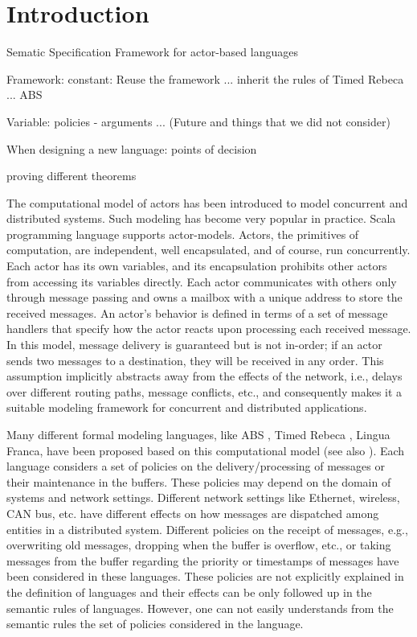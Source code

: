 \section{Introduction}

Sematic Specification Framework for actor-based languages

Framework:
constant: Reuse the framework ...
inherit the rules of Timed Rebeca ... ABS 

Variable: policies - arguments ...
(Future and things that we did not consider)

When designing a new language: points of decision 

proving different theorems

The computational model of actors \cite{Hewitt77,Agha90} has been introduced to model concurrent and distributed systems. Such modeling has become very popular in practice. Scala programming language supports actor-models. Actors, the primitives of computation, are independent, well encapsulated, and of course, run concurrently. Each actor has its own variables, and its encapsulation prohibits other actors from accessing its variables directly. Each actor communicates with others only through message passing and owns a mailbox with a unique address to store the received messages. An actor's behavior is defined in terms of a set of message handlers that specify how the actor reacts upon processing each received message. In this model, message delivery is guaranteed but is not in-order; if an actor sends two messages to a destination, they will be received in any order. This assumption implicitly abstracts away from the effects of the network, i.e., delays over different routing paths, message conflicts, etc., and consequently makes it a suitable modeling framework for concurrent and distributed applications. 


Many different formal modeling languages, like ABS \cite{ABS}, Timed Rebeca \cite{SirjaniK16}, Lingua Franca, have been proposed based on this computational model (see also \cite{survay}). Each language considers a set of policies on the delivery/processing of messages or their maintenance in the buffers. These policies may depend on the domain of systems and network settings. Different network settings like Ethernet, wireless, CAN bus, etc. have different effects on how messages are dispatched among entities in a distributed system. Different policies on the receipt of messages, e.g., overwriting old messages, dropping when the buffer is overflow, etc., or taking messages from the buffer regarding the priority or timestamps of messages have been considered in these languages. These policies are not explicitly explained in the definition of languages and their effects can be only followed up in the semantic rules of languages. However, one can not easily understands from the semantic rules the set of policies considered in the language. %


